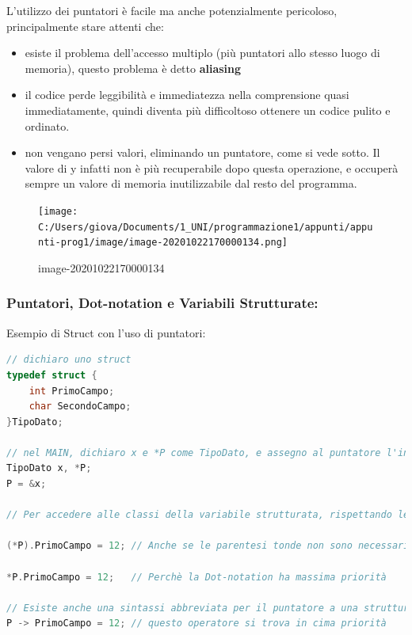 \documentclass[
  paper=a4,
  oneside  ,captions=tableheading
]{scrbook}
\providecommand{\tightlist}{%
  \setlength{\itemsep}{0pt}\setlength{\parskip}{0pt}}
\begin{document}
L'utilizzo dei puntatori è facile ma anche potenzialmente pericoloso,
principalmente stare attenti che:

\begin{itemize}
\tightlist
\item
  esiste il problema dell'accesso multiplo (più puntatori allo stesso
  luogo di memoria), questo problema è detto \textbf{aliasing}
\item
  il codice perde leggibilità e immediatezza nella comprensione quasi
  immediatamente, quindi diventa più difficoltoso ottenere un codice
  pulito e ordinato.
\item
  non vengano persi valori, eliminando un puntatore, come si vede sotto.
  Il valore di y infatti non è più recuperabile dopo questa operazione,
  e occuperà sempre un valore di memoria inutilizzabile dal resto del
  programma.
\end{itemize}

\begin{figure}
\centering
\texttt{[image: C:/Users/giova/Documents/1\_UNI/programmazione1/appunti/appunti-prog1/image/image-20201022170000134.png]}
\caption{image-20201022170000134}
\end{figure}

\hypertarget{puntatori-dot-notation-e-variabili-strutturate}{%
\subsubsection{Puntatori, Dot-notation e Variabili
Strutturate:}\label{puntatori-dot-notation-e-variabili-strutturate}}

Esempio di Struct con l'uso di puntatori:

\begin{lstlisting}[language=C]
// dichiaro uno struct
typedef struct {
    int PrimoCampo;
    char SecondoCampo;
}TipoDato;

// nel MAIN, dichiaro x e *P come TipoDato, e assegno al puntatore l'indirizzo di x
TipoDato x, *P;
P = &x;

// Per accedere alle classi della variabile strutturata, rispettando le precedenze degli operatori:

(*P).PrimoCampo = 12; // Anche se le parentesi tonde non sono necessarie

*P.PrimoCampo = 12;   // Perchè la Dot-notation ha massima priorità

// Esiste anche una sintassi abbreviata per il puntatore a una struttura:
P -> PrimoCampo = 12; // questo operatore si trova in cima priorità
\end{lstlisting}
\end{document}

